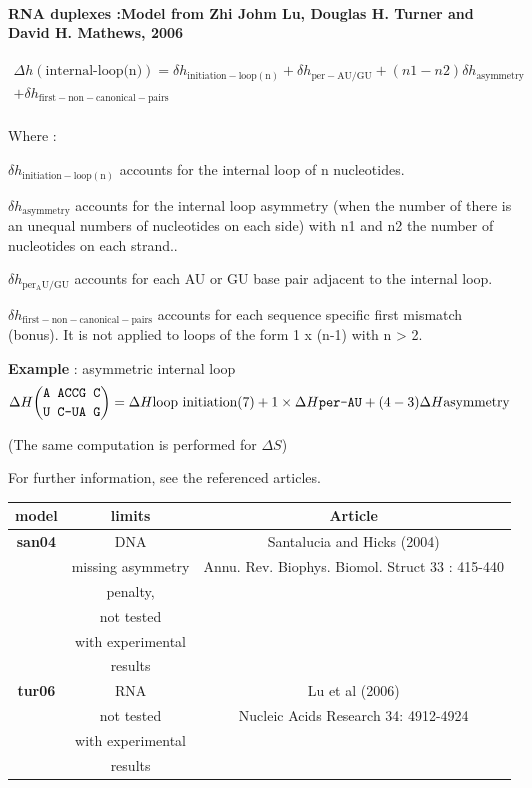 \documentclass{article}
\begin{document}
\paragraph{RNA duplexes :\textbf{Model from Zhi Johm Lu, Douglas H. Turner and David H. Mathews, 2006}}

\begin{multline*}
\Delta h {(\mbox{internal-loop(n)})} =
\delta{}h_\mathrm{initiation-loop(n)} +
\delta{}h_\mathrm{per-AU/GU} +
(n1 - n2) \delta{}h_\mathrm{asymmetry} \\ +
\delta{}h_\mathrm{first-non-canonical-pairs}\\
\end{multline*}


Where :

$\delta{}h_\mathrm{initiation-loop(n)}$ accounts for the internal loop of n nucleotides.

$\delta{}h_\mathrm{asymmetry}$ accounts for the internal loop asymmetry (when the number of
there is an unequal numbers of nucleotides on each side) with n1 and n2 the
number of nucleotides on each strand..

$\delta{}h_\mathrm{per_AU/GU}$ accounts for each AU or GU base pair adjacent
to the internal loop.

$\delta{}h_\mathrm{first-non-canonical-pairs}$ accounts for each sequence
specific first mismatch (bonus). It is not applied to loops of the form 1 x (n-1) with
n > 2.


\textbf{Example} : asymmetric internal loop
\begin{multline*}
\Delta H {\mbox{\texttt{A ACCG C}} \choose \mbox{\texttt{U C-UA G}}} = 
\Delta H {\mbox{loop initiation(7)}} +
1 \times \Delta H {\mbox{\texttt{per-AU}}} +
(4 - 3)\Delta H {\mbox{asymmetry}}\\
\end{multline*}

       (The same computation is performed for $\Delta S$)    
       
For further information, see the referenced articles.

\begin{table}[hc]
\begin{tabular}[h]{| c | c | c |}
\textbf{model} & \textbf{limits} & \textbf{Article} \\
\hline
\textbf{san04} & DNA & Santalucia and Hicks (2004) \\
 & missing asymmetry & Annu. Rev. Biophys. Biomol. Struct 33 : 415-440\\
 & penalty, & \\
 & not tested & \\
 & with experimental & \\
 & results & \\
 \hline
\textbf{tur06} & RNA & Lu et al (2006) \\
 & not tested & Nucleic Acids Research 34: 4912-4924 \\
 & with experimental & \\
 & results & \\
 \hline
\end{tabular}
\end{table}
\end{document}
